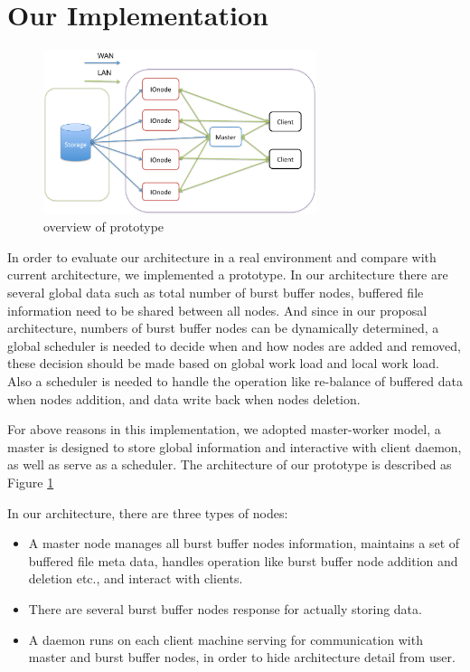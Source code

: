 \section{Our Implementation}
\label{sec:implementation}

\begin{figure}
\centering
\includegraphics[width=8cm]{img/prototype_overview}
\caption{overview of prototype}
\label{implemetation:overview of prototype}
\end{figure}

In order to evaluate our architecture in a real environment and compare with current architecture,
we implemented a prototype.
In our architecture there are several global data such as total number of burst buffer nodes,
buffered file information need to be shared between all nodes.
And since in our proposal architecture, numbers of burst buffer nodes can be dynamically determined,
a global scheduler is needed to decide when and how nodes are added and removed, these decision
should be made based on global work load and local work load.
Also a scheduler is needed to handle the operation like re-balance of buffered data when nodes
addition, and data write back when nodes deletion.

For above reasons in this implementation, we adopted master-worker model, a master is designed to
store global information and interactive with client daemon, as well as serve as a scheduler.
The architecture of our prototype is described as Figure \ref{implemetation:overview of prototype}

In our architecture, there are three types of nodes:
\begin{itemize}
	\item A master node manages all burst buffer nodes information, maintains a set of buffered file
	meta data, handles operation like burst buffer node addition and deletion etc., and interact with
	clients.
	\item There are several burst buffer nodes response for actually storing data.
	\item A daemon runs on each client machine serving for communication with
	master and burst buffer nodes, in order to hide architecture detail from user.
\end{itemize}

